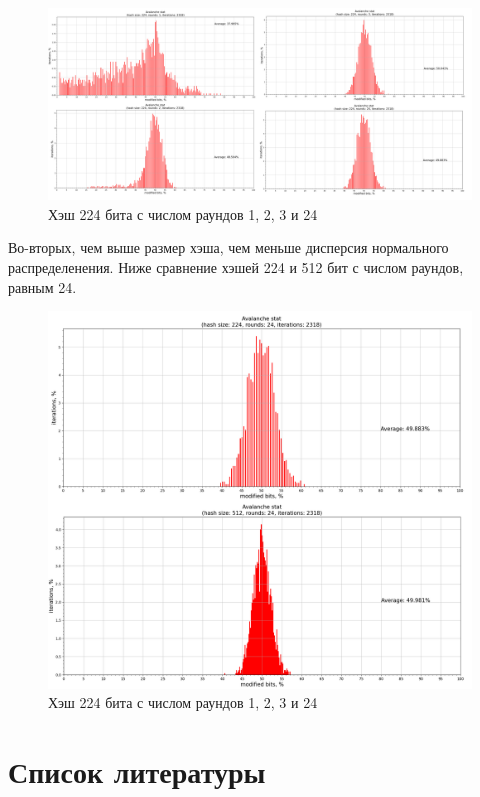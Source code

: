 \documentclass[a4paper,12pt]{article}
\theoremstyle{plain} %
\theoremstyle{definition} %
\theoremstyle{remark} %
\begin{document}
	\begin{figure}[ht!]
	\centering
	\includegraphics[width=165mm]{224-1_2_3_24.png}
	\caption{Хэш 224 бита с числом раундов 1, 2, 3 и 24}
	\end{figure}

	\newpage
	
	Во-вторых, чем выше размер хэша, чем меньше дисперсия нормального распределенения. Ниже сравнение хэшей 224 и 512 бит с числом раундов, равным 24.
	
		\begin{figure}[ht!]
		\centering
		\includegraphics[width=180mm]{224-512_24.png}
		\caption{Хэш 224 бита с числом раундов 1, 2, 3 и 24}
	\end{figure}
	
	\section{Список литературы}
	
\end{document}
